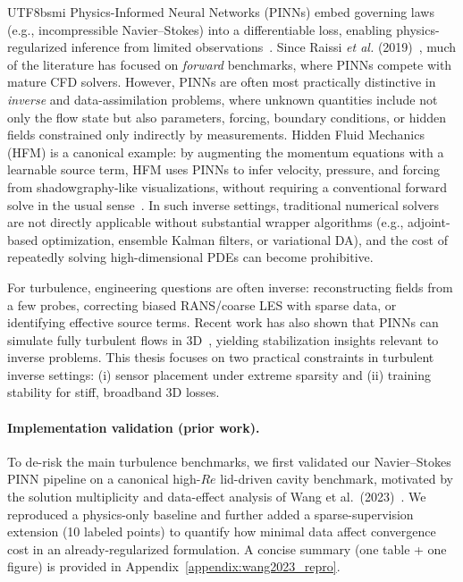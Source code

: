 \documentclass[master]{NTHUthesis}
\begin{document}
\begin{CJK*}{UTF8}{bsmi}
Physics-Informed Neural Networks (PINNs) embed governing laws (e.g., incompressible Navier--Stokes) into a differentiable loss, enabling physics-regularized inference from limited observations~\cite{Raissi2019JCP, Karniadakis2021NRP}. Since Raissi \emph{et al.} (2019)~\cite{Raissi2019JCP}, much of the literature has focused on \emph{forward} benchmarks, where PINNs compete with mature CFD solvers. However, PINNs are often most practically distinctive in \emph{inverse} and data-assimilation problems, where unknown quantities include not only the flow state but also parameters, forcing, boundary conditions, or hidden fields constrained only indirectly by measurements. Hidden Fluid Mechanics (HFM) is a canonical example: by augmenting the momentum equations with a learnable source term, HFM uses PINNs to infer velocity, pressure, and forcing from shadowgraphy-like visualizations, without requiring a conventional forward solve in the usual sense~\cite{Raissi2020Science}. In such inverse settings, traditional numerical solvers are not directly applicable without substantial wrapper algorithms (e.g., adjoint-based optimization, ensemble Kalman filters, or variational DA), and the cost of repeatedly solving high-dimensional PDEs can become prohibitive.

For turbulence, engineering questions are often inverse: reconstructing fields from a few probes, correcting biased RANS/coarse LES with sparse data, or identifying effective source terms. Recent work has also shown that PINNs can simulate fully turbulent flows in 3D~\cite{wang2025simulatingthreedimensionalturbulencephysicsinformed}, yielding stabilization insights relevant to inverse problems. This thesis focuses on two practical constraints in turbulent inverse settings: (i) sensor placement under extreme sparsity and (ii) training stability for stiff, broadband 3D losses.

\paragraph{Implementation validation (prior work).}
To de-risk the main turbulence benchmarks, we first validated our Navier--Stokes PINN pipeline on a canonical high-$Re$ lid-driven cavity benchmark, motivated by the solution multiplicity and data-effect analysis of Wang et al.\ (2023)~\cite{wang2023solutionmultiplicityeffectsdata}. We reproduced a physics-only baseline and further added a sparse-supervision extension (10 labeled points) to quantify how minimal data affect convergence cost in an already-regularized formulation. A concise summary (one table + one figure) is provided in Appendix~\ref{appendix:wang2023_repro}.


\end{CJK*}
\end{document}
